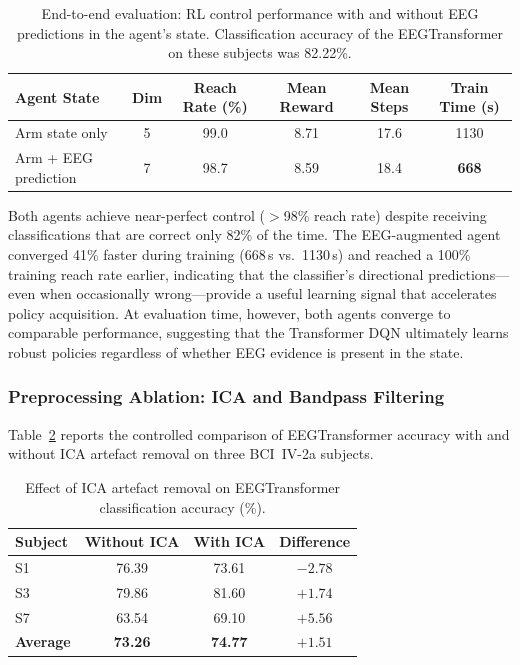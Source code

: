 \documentclass[12pt, a4paper]{article}
\begin{document}
\begin{table}[htbp]
\centering
\caption{End-to-end evaluation: RL control performance with and without EEG predictions in the agent's state. Classification accuracy of the EEGTransformer on these subjects was 82.22\%.}
\label{tab:e2e_eval}
\begin{tabular}{lccccc}
\toprule
\textbf{Agent State} & \textbf{Dim} & \textbf{Reach Rate (\%)} & \textbf{Mean Reward} & \textbf{Mean Steps} & \textbf{Train Time (s)} \\
\midrule
Arm state only     & 5 & 99.0 & 8.71 & 17.6 & 1130 \\
Arm + EEG prediction & 7 & 98.7 & 8.59 & 18.4 & \textbf{668} \\
\bottomrule
\end{tabular}
\end{table}

Both agents achieve near-perfect control ($>$98\% reach rate) despite receiving classifications that are correct only 82\% of the time. The EEG-augmented agent converged 41\% faster during training (668\,s vs.\ 1130\,s) and reached a 100\% training reach rate earlier, indicating that the classifier's directional predictions---even when occasionally wrong---provide a useful learning signal that accelerates policy acquisition. At evaluation time, however, both agents converge to comparable performance, suggesting that the Transformer DQN ultimately learns robust policies regardless of whether EEG evidence is present in the state.

\subsubsection{Preprocessing Ablation: ICA and Bandpass Filtering}
\label{sec:ica_results}
\label{sec:res_preproc}

Table~\ref{tab:ica_comparison} reports the controlled comparison of EEGTransformer accuracy with and without ICA artefact removal on three BCI~IV-2a subjects.

\begin{table}[htbp]
\centering
\caption{Effect of ICA artefact removal on EEGTransformer classification accuracy (\%).}
\label{tab:ica_comparison}
\begin{tabular}{lccc}
\toprule
\textbf{Subject} & \textbf{Without ICA} & \textbf{With ICA} & \textbf{Difference} \\
\midrule
S1 & 76.39 & 73.61 & $-2.78$ \\
S3 & 79.86 & 81.60 & $+1.74$ \\
S7 & 63.54 & 69.10 & $+5.56$ \\
\midrule
\textbf{Average} & \textbf{73.26} & \textbf{74.77} & $\mathbf{+1.51}$ \\
\bottomrule
\end{tabular}
\end{table}
\end{document}
